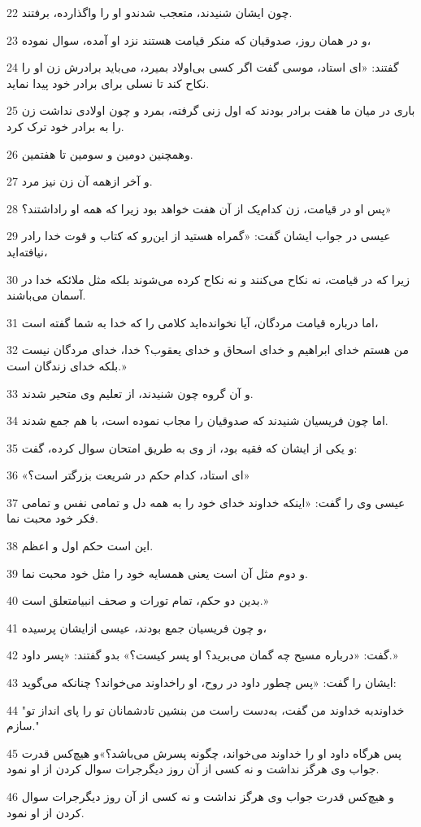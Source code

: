 \par 22 چون ایشان شنیدند، متعجب شدندو او را واگذارده، برفتند.
\par 23 و در همان روز، صدوقیان که منکر قیامت هستند نزد او آمده، سوال نموده،
\par 24 گفتند: «ای استاد، موسی گفت اگر کسی بی‌اولاد بمیرد، می‌باید برادرش زن او را نکاح کند تا نسلی برای برادر خود پیدا نماید.
\par 25 باری در میان ما هفت برادر بودند که اول زنی گرفته، بمرد و چون اولادی نداشت زن را به برادر خود ترک کرد.
\par 26 وهمچنین دومین و سومین تا هفتمین.
\par 27 و آخر ازهمه آن زن نیز مرد.
\par 28 پس او در قیامت، زن کدام‌یک از آن هفت خواهد بود زیرا که همه او راداشتند؟»
\par 29 عیسی در جواب ایشان گفت: «گمراه هستید از این‌رو که کتاب و قوت خدا رادر نیافته‌اید،
\par 30 زیرا که در قیامت، نه نکاح می‌کنند و نه نکاح کرده می‌شوند بلکه مثل ملائکه خدا در آسمان می‌باشند.
\par 31 اما درباره قیامت مردگان، آیا نخوانده‌اید کلامی را که خدا به شما گفته است،
\par 32 من هستم خدای ابراهیم و خدای اسحاق و خدای یعقوب؟ خدا، خدای مردگان نیست بلکه خدای زندگان است.»
\par 33 و آن گروه چون شنیدند، از تعلیم وی متحیر شدند.
\par 34 اما چون فریسیان شنیدند که صدوقیان را مجاب نموده است، با هم جمع شدند.
\par 35 و یکی از ایشان که فقیه بود، از وی به طریق امتحان سوال کرده، گفت:
\par 36 «ای استاد، کدام حکم در شریعت بزرگتر است؟»
\par 37 عیسی وی را گفت: «اینکه خداوند خدای خود را به همه دل و تمامی نفس و تمامی فکر خود محبت نما.
\par 38 این است حکم اول و اعظم.
\par 39 و دوم مثل آن است یعنی همسایه خود را مثل خود محبت نما.
\par 40 بدین دو حکم، تمام تورات و صحف انبیامتعلق است.»
\par 41 و چون فریسیان جمع بودند، عیسی ازایشان پرسیده،
\par 42 گفت: «درباره مسیح چه گمان می‌برید؟ او پسر کیست؟» بدو گفتند: «پسر داود.»
\par 43 ایشان را گفت: «پس چطور داود در روح، او راخداوند می‌خواند؟ چنانکه می‌گوید:
\par 44 "خداوندبه خداوند من گفت، به‌دست راست من بنشین تادشمانان تو را پای انداز تو سازم."
\par 45 پس هرگاه داود او را خداوند می‌خواند، چگونه پسرش می‌باشد؟»و هیچ‌کس قدرت جواب وی هرگز نداشت و نه کسی از آن روز دیگرجرات سوال کردن از او نمود.
\par 46 و هیچ‌کس قدرت جواب وی هرگز نداشت و نه کسی از آن روز دیگرجرات سوال کردن از او نمود.

